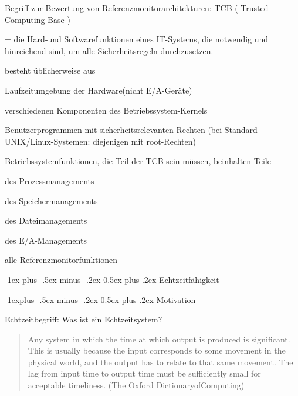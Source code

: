 \documentclass[a4paper]{article}
\makeatletter
\renewcommand{\section}{\@startsection{section}{1}{0mm}%
 {-1ex plus -.5ex minus -.2ex}%
 {0.5ex plus .2ex}%
 {\normalfont\large\bfseries}}
\renewcommand{\subsection}{\@startsection{subsection}{2}{0mm}%
 {-1explus -.5ex minus -.2ex}%
 {0.5ex plus .2ex}%
 {\normalfont\normalsize\bfseries}}
\makeatother
\begin{document}
\begin{multicols}{3}
    Begriff zur Bewertung von Referenzmonitorarchitekturen: TCB ( Trusted
    Computing Base )

    \begin{itemize*}
        \item
        = die Hard-und Softwarefunktionen eines IT-Systems, die notwendig und
        hinreichend sind, um alle Sicherheitsregeln durchzusetzen.
        \item
        besteht üblicherweise aus
        \begin{enumerate*}

            \item Laufzeitumgebung der Hardware(nicht E/A-Geräte)
            \item verschiedenen Komponenten des Betriebssystem-Kernels
            \item Benutzerprogrammen mit sicherheitsrelevanten Rechten (bei Standard-UNIX/Linux-Systemen: diejenigen mit root-Rechten)
        \end{enumerate*}
        \item
        Betriebssystemfunktionen, die Teil der TCB sein müssen, beinhalten
        Teile
        \begin{itemize*}
            \item des Prozessmanagements
            \item des Speichermanagements
            \item des Dateimanagements
            \item des E/A-Managements
            \item alle Referenzmonitorfunktionen
        \end{itemize*}
    \end{itemize*}


    \section{Echtzeitfähigkeit}


    \subsection{Motivation}

    Echtzeitbegriff: Was ist ein Echtzeitsystem?

    \begin{quote}
        Any system in which the time at which output is produced is significant.
        This is usually because the input corresponds to some movement in the
        physical world, and the output has to relate to that same movement. The
        lag from input time to output time must be sufficiently small for
        acceptable timeliness. (The Oxford DictionaryofComputing)
    \end{quote}


\end{multicols}
\end{document}
